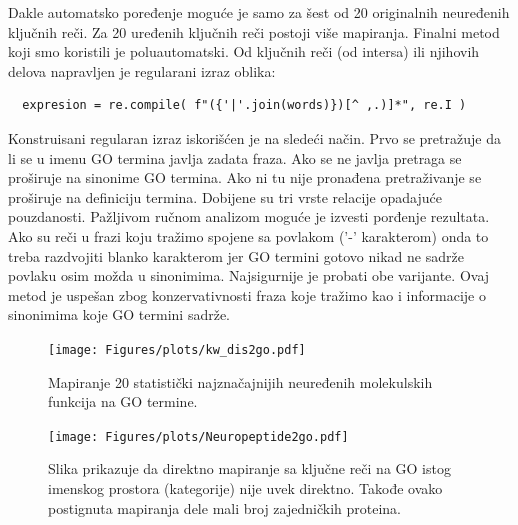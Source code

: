 Dakle automatsko poređenje moguće je samo za šest od 20 originalnih neuređenih
ključnih reči. Za 20 uređenih ključnih reči postoji više mapiranja.  
Finalni metod koji smo koristili je poluautomatski. Od ključnih reči (od intersa)
ili njihovih delova napravljen je regularani izraz oblika:
\begin{verbatim}
  expresion = re.compile( f"({'|'.join(words)})[^ ,.)]*", re.I )
\end{verbatim}
Konstruisani regularan izraz iskorišćen je na sledeći način.  Prvo se pretražuje
da li se u imenu GO termina javlja zadata fraza.  Ako se ne javlja pretraga 
se proširuje na  sinonime GO termina. Ako ni tu nije pronađena pretraživanje se
proširuje na definiciju termina. Dobijene su tri vrste relacije opadajuće
pouzdanosti. Pažljivom ručnom analizom moguće je izvesti porđenje
rezultata. Ako su reči u frazi koju tražimo spojene sa povlakom ('-' karakterom)
onda to treba razdvojiti blanko karakterom jer GO termini gotovo nikad
ne sadrže povlaku osim možda u sinonimima. Najsigurnije je probati obe varijante.
Ovaj metod je uspešan zbog konzervativnosti fraza koje tražimo kao i informacije 
o sinonimima koje GO termini sadrže.






\begin{figure}[th]
\hspace*{-2.2cm} 
\texttt{[image: Figures/plots/kw\_dis2go.pdf]}
\decoRule
\caption {
  Mapiranje 20 statistički najznačajnijih neuređenih molekulskih funkcija \parencite{Xie2007} 
  na GO termine.
}
\label{fig:KWtop20dis}
\end{figure}


\begin{figure}[th]
\centering
\hspace*{-2.2cm} 
\texttt{[image: Figures/plots/Neuropeptide2go.pdf]}
\decoRule
\caption {
  Slika prikazuje da direktno mapiranje sa ključne reči na GO istog imenskog prostora (kategorije) nije uvek direktno.
  Takođe ovako postignuta mapiranja dele mali broj zajedničkih proteina.
}
\label{fig:neuropeptide}
\end{figure}
